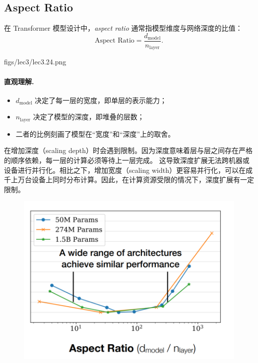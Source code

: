 \clearpage
\subsection{Aspect Ratio}

在 Transformer 模型设计中，\emph{aspect ratio} 通常指模型维度与网络深度的比值：
\[
    \text{Aspect Ratio} = \frac{d_{\text{model}}}{n_{\text{layer}}}.
\]

\MarginImageWithNote
  {figs/lec3/lec3.24.png}
  {}

\paragraph{直观理解.}
\begin{itemize}
  \item $d_{\text{model}}$ 决定了每一层的宽度，即单层的表示能力；
  \item $n_{\text{layer}}$ 决定了模型的深度，即堆叠的层数；
  \item 二者的比例刻画了模型在“宽度”和“深度”上的取舍。
\end{itemize}


在增加深度（scaling depth）时会遇到限制。因为深度意味着层与层之间存在严格的顺序依赖，每一层的计算必须等待上一层完成。
这导致深度扩展无法跨机器或设备进行并行化。相比之下，增加宽度（scaling width）更容易并行化，可以在成千上万台设备上同时分布计算。因此，在计算资源受限的情况下，深度扩展有一定限制。


\begin{figure}[htbp]
  \centering
  \includegraphics[width=0.8\linewidth]{figs/lec3/lec3.25.png}
\end{figure}

